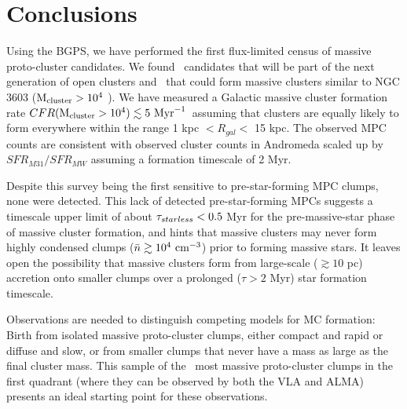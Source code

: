 \section{Conclusions}
\label{sec:ympcconclusions}

Using the BGPS, we have performed the first flux-limited census of massive
proto-cluster candidates.  We found \ncandidates\ candidates that will be part
of the next generation of open clusters and \nMPC\ that could form massive
clusters similar to NGC 3603 (${\rm M}_{\rm cluster} > 10^4$ \msun).   We have
measured a Galactic massive cluster formation rate $CFR({\rm M}_{\rm
cluster}>10^4) \lesssim 5\  \mathrm{Myr}^{-1}$\ assuming that clusters are equally
likely to form everywhere within the range 1 kpc $ < R_{gal} < $ 15   kpc. 
The observed MPC counts are
consistent with observed cluster counts in Andromeda scaled up by $SFR_{M31} /
SFR_{MW}$ assuming a formation timescale of 2 Myr.  

Despite this survey being the first sensitive to pre-star-forming MPC clumps, none
were detected.  This lack of detected pre-star-forming MPCs suggests a
timescale upper limit of about $\tau_{starless}<0.5$ Myr for the pre-massive-star phase of
massive cluster formation, and hints that massive clusters may never form
highly condensed clumps ($\bar{n}\gtrsim10^4~\textrm{cm}^{-3}$) prior to forming massive
stars.
It leaves open the possibility that massive clusters form from large-scale
($\gtrsim 10$ pc) accretion onto smaller clumps over a prolonged ($\tau > 2$
Myr) star formation timescale.


Observations are needed to distinguish competing models for MC formation:
Birth from isolated massive proto-cluster clumps, either compact and rapid
or diffuse and slow, or from smaller clumps that
never have a mass as large as the final cluster
mass.  
This sample of the \ncandidates\ most massive proto-cluster clumps in the first
quadrant (where they can be observed by both the VLA and ALMA) presents an ideal
starting point for these observations.



